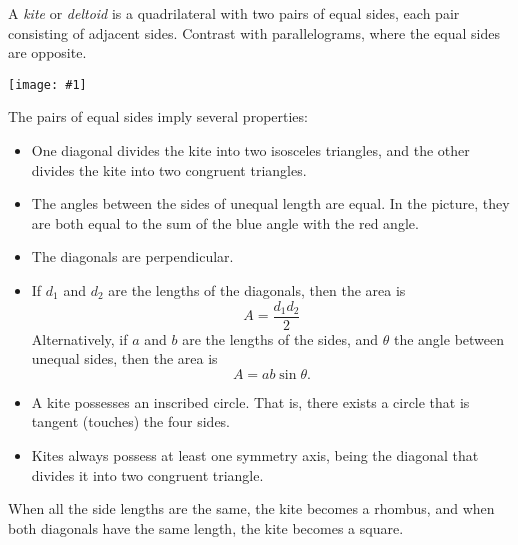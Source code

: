 \documentclass[12pt]{article}
\newcommand{\figuraex}[2]{\begin{center}\texttt{[image: \#1]}\end{center}}
\begin{document}
A \emph{kite} or \emph{deltoid} is a quadrilateral with  two pairs of equal sides, each pair consisting of adjacent sides. Contrast with parallelograms, where the equal sides are opposite.
\figuraex{GeometricKite.eps}{scale=0.75}

The pairs of equal sides imply several properties:
\begin{itemize}
\item One diagonal divides the kite into two isosceles triangles, and the other divides the kite into two congruent triangles.
\item The angles  between the sides of unequal length are equal. In the picture, they are both equal to the sum of the blue angle with the red angle.
\item The diagonals are perpendicular. 
\item If $d_1$ and $d_2$ are the lengths of the diagonals, then the area is
\[A=\frac{d_1d_2}{2}\]
Alternatively, if $a$ and $b$ are the lengths of the sides, and $\theta$ the angle between unequal sides, then the area is
\[A={a b \sin\theta}.\]
\item A kite possesses an inscribed circle. That is, there exists a circle that is tangent (touches) the four sides.
\item Kites always possess at least one symmetry axis, being the diagonal that divides it into two congruent triangle.
\end{itemize}

When all the side lengths are the same, the kite becomes a rhombus, and when both diagonals have the same length, the kite becomes a square.
\end{document}
